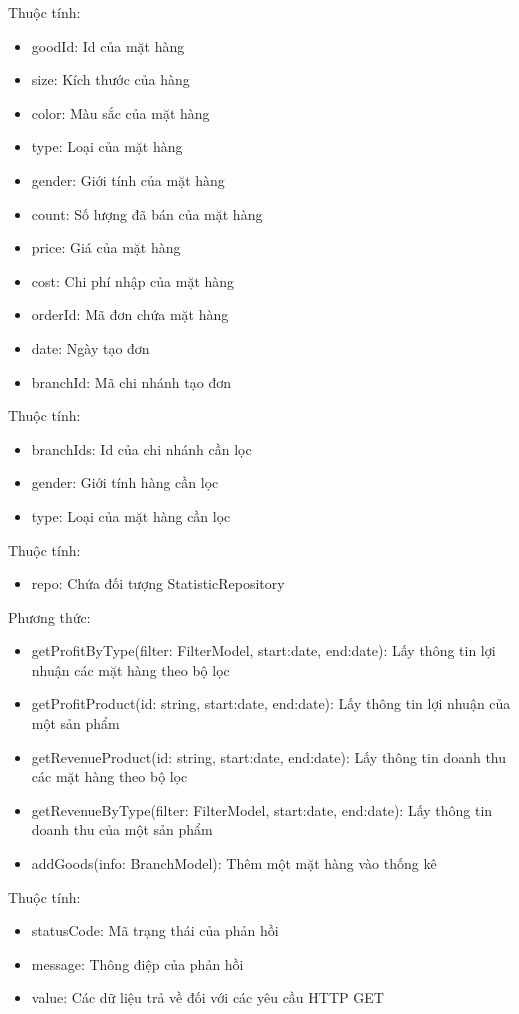 Thuộc tính:
\begin{itemize}
	\item goodId: Id của mặt hàng
	\item size: Kích thước của hàng
	\item color: Màu sắc của mặt hàng
	\item type: Loại của mặt hàng
	\item gender: Giới tính của mặt hàng
	\item count: Số lượng đã bán của mặt hàng
	\item price: Giá của mặt hàng
	\item cost: Chi phí nhập của mặt hàng
	\item orderId: Mã đơn chứa mặt hàng
	\item date: Ngày tạo đơn
	\item branchId: Mã chi nhánh tạo đơn
\end{itemize}

Thuộc tính:
\begin{itemize}
	\item branchIds: Id của chi nhánh cần lọc
	\item gender: Giới tính hàng cần lọc
	\item type: Loại của mặt hàng cần lọc
\end{itemize}

Thuộc tính:
\begin{itemize}
	\item repo: Chứa đối tượng StatisticRepository
\end{itemize}
Phương thức:
\begin{itemize}
	\item getProfitByType(filter: FilterModel, start:date,
	end:date): Lấy thông tin lợi nhuận các mặt hàng theo bộ lọc
	\item getProfitProduct(id: string, start:date,
	end:date): Lấy thông tin lợi nhuận của một sản phẩm
	\item getRevenueProduct(id: string, start:date,
	end:date): Lấy thông tin doanh thu các mặt hàng theo bộ lọc
	\item getRevenueByType(filter: FilterModel, start:date,
	end:date): Lấy thông tin doanh thu của một sản phẩm
	\item addGoods(info: BranchModel): Thêm một mặt hàng vào thống kê
\end{itemize}

Thuộc tính:
\begin{itemize}
	\item statusCode: Mã trạng thái của phản hồi
	\item message: Thông điệp của phản hồi
	\item value: Các dữ liệu trả về đối với các yêu cầu HTTP GET
\end{itemize}



